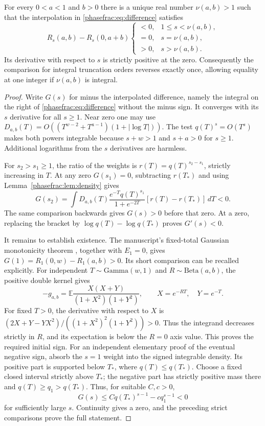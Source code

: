 \begin{theorem}
\label{phasefrac:thm:unique}
For every $0<a<1$ and $b>0$ there is a unique real number
$\nu(a,b)>1$ such that the interpolation in
\eqref{phasefrac:eq:difference} satisfies
\[
 R_s(a,b)-R_s(0,a+b)
 \begin{cases}
 <0,&1\le s<\nu(a,b),\\
 =0,&s=\nu(a,b),\\
 >0,&s>\nu(a,b).
 \end{cases}
\]
Its derivative with respect to $s$ is strictly positive at the zero.
Consequently the comparison for integral truncation orders reverses
exactly once, allowing equality at one integer if $\nu(a,b)$ is integral.
\end{theorem}
\begin{proof}
Write $G(s)$ for minus the interpolated difference, namely the
integral on the right of \eqref{phasefrac:eq:difference} without
the minus sign. It converges with its $s$ derivative for all $s\ge1$.
Near zero one may use
$D_{a,b}(T)=O((T^{w-2}+T^{a-1})(1+|\log T|))$.
The test $q(T)^s=O(T^s)$ makes both powers integrable because
$s+w>1$ and $s+a>0$ for $s\ge1$.
Additional logarithms from the $s$ derivatives are harmless.

For $s_2>s_1\ge1$, the ratio of the weights is
$r(T)=q(T)^{s_2-s_1}$, strictly increasing in $T$. At any zero
$G(s_1)=0$, subtracting $r(T_*)$ and using
Lemma~\ref{phasefrac:lem:density} gives
\[
 G(s_2)=\int D_{a,b}(T)
 \frac{e^{-T}q(T)^{s_1}}{1+e^{-2T}}
       [r(T)-r(T_*)]\,dT<0.
\]
The same comparison backwards gives $G(s)>0$ before that zero.
At a zero, replacing the bracket by
$\log q(T)-\log q(T_*)$ proves $G'(s)<0$.

It remains to establish existence. The manuscript's fixed-total Gaussian monotonicity theorem
\cite[\texttt{subpick:thm:fixed-total}]{baseline}, together with $E_1=0$,
gives $G(1)=R_1(0,w)-R_1(a,b)>0$. Its short comparison can be
recalled explicitly. For independent $T\sim\mathrm{Gamma}(w,1)$ and
$R\sim\mathrm{Beta}(a,b)$, the positive double kernel gives
\[
 -g_{a,b}=\mathbb E\frac{X(X+Y)}{(1+X^2)(1+Y^2)},
 \qquad X=e^{-RT},\quad Y=e^{-T}.
\]
For fixed $T>0$, the derivative with respect to $X$ is
$(2X+Y-YX^2)/((1+X^2)^2(1+Y^2))>0$.
Thus the integrand decreases strictly in $R$, and its expectation
is below the $R=0$ axis value. This proves the required initial sign.
For an independent elementary proof of the eventual negative sign,
absorb the $s=1$ weight into the signed integrable density.
Its positive part is supported below $T_*$, where $q(T)\le q(T_*)$.
Choose a fixed closed interval strictly above $T_*$; the negative
part has strictly positive mass there and $q(T)\ge q_1>q(T_*)$.
Thus, for suitable $C,c>0$,
\[
 G(s)\le Cq(T_*)^{s-1}-c q_1^{s-1}<0
\]
for sufficiently large $s$. Continuity gives a zero, and the preceding
strict comparisons prove the full statement.
\end{proof}

